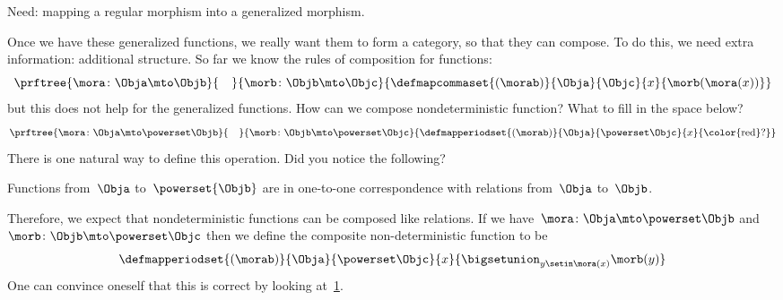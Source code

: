 Need: mapping a regular morphism into a generalized morphism.

Once we have these generalized functions, we really want them to form a category, so that they can compose.
To do this, we need extra information: additional structure.
So far we know the rules of composition for functions:
%
\begin{equation}
    \label{eq:monad-function-composition}
    \prftree{\mora\colon \Obja \mto \Objb}{\quad}{\morb\colon \Objb \mto \Objc}
    {
        \defmapcommaset{
            (\morab)
        }{
            \Obja
        }{
            \Objc
        }{
            x
        }{
            \morb(\mora(x))
        }
    }
\end{equation}
%
but this does not help for the generalized functions.
How can we compose nondeterministic function?
What to fill in the space below?
%
\begin{equation}
    \label{eq:monad-gen-function-composition}
    \prftree{
        \mora\colon \Obja \mto \powerset\Objb
    }{
        \quad
    }{
        \morb\colon \Objb \mto \powerset \Objc
    }{
        \defmapperiodset{(\morab)}{\Obja}{\powerset\Objc}%
        {x}{\text{\color{red}?}}
    }
\end{equation}
%
There is one natural way to define this operation.
Did you notice the following?

\begin{lemma}
    \label{lem:powersets-relations}
    Functions from~$\Obja$ to~$\powerset{\Objb}$ are in one-to-one correspondence with relations from~$\Obja$ to~$\Objb$.
\end{lemma}


Therefore, we expect that nondeterministic functions can be composed like relations.
If we have~$\mora\colon \Obja \mto \powerset\Objb$ and~$\morb\colon \Objb \mto \powerset \Objc$ then we define the composite non-deterministic function to be
%
\begin{equation}
    \label{eq:fish-nondet}
    \defmapperiodset{(\morab)}{\Obja}{\powerset\Objc}%
    {x}{ \displaystyle \bigsetunion_{y\setin \mora(x)}\morb(y)}
\end{equation}
%
One can convince oneself that this is correct by looking at~\cref{fig:mapping-nondeterministic}.

\begin{figure}[h]
    \caption{}
    \label{fig:mapping-nondeterministic}
\end{figure}

